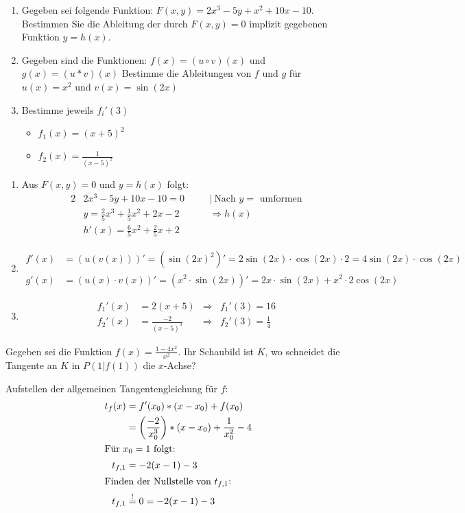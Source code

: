 \begin{enumerate}
	\item Gegeben sei folgende Funktion: $F(x,y)=2x^3-5y+x^2+10x-10$. Bestimmen Sie die Ableitung der durch $F(x,y)=0$ implizit gegebenen Funktion $y=h(x)$.
	\item Gegeben sind die Funktionen:
	$f(x) = (u \circ v)(x)$ und $g(x) = (u* v)(x)$
	Bestimme die Ableitungen von $f$ und $g$ für $u(x)=x^2$ und $v(x)=\sin(2x)$
	\item Bestimme jeweils $f_i'(3)$
	\begin{itemize}
		\item $f_1(x) = (x+5)^2$
		\item $f_2(x) = \frac{1}{(x-5)^2}$
	\end{itemize}
\end{enumerate}
\begin{lsg}{}
	\begin{enumerate}
		\item Aus $F(x,y)=0$ und $y=h(x)$ folgt:\begin{alignat*}{2}
		&2x^3-5y+10x-10=0\quad&&|\ \text{Nach $y=$ umformen}\\
		&y=\frac{2}{5} x^3+\frac{1}{5} x^2+2x-2 &&\Rightarrow h(x)\\
		&h'(x)=\frac{6}{5} x^2+\frac{2}{5}x+2
		\end{alignat*}
		\item \begin{align*}
		f'(x)&=\left(u(v(x))\right)'=\left({\sin(2x)}^2\right)'=2\sin(2x)\cdot \cos(2x) \cdot 2=4\sin(2x)\cdot \cos(2x)\\
		g'(x)&=(u(x)\cdot v(x))'=\left(x^2\cdot \sin(2x)\right)'=2x\cdot \sin(2x)+x^2\cdot 2\cos(2x)
		\end{align*}
		\item \begin{align*}
		f_1'(x)&=2(x+5)&\Rightarrow  &f_1'(3)=16\\
		f_2'(x)&=\frac{-2}{(x-5)^3}&\Rightarrow &f_2'(3)=\frac{1}{4}
		\end{align*}
	\end{enumerate}
\end{lsg}




Gegeben sei die Funktion $f(x) = \frac{1-4x^2}{x^2}$. Ihr Schaubild ist $K$, wo schneidet die Tangente an $K$ in $P(1|f(1))$ die $x$-Achse?
\begin{lsg}{}
	Aufstellen der allgemeinen Tangentengleichung für $f$:
	\begin{align*}
		t_f(x)&=f'(x_0)*(x-x_0)+f(x_0)\\
					&=\left(\frac{-2}{x_0^3}\right)*(x-x_0)+\frac{1}{x_0^2}-4\\
		\intertext{Für $x_0=1$ folgt:}
		t_{f,1}&=-2(x-1)-3\\
		\intertext{Finden der Nullstelle von $t_{f,1}$:}
		t_{f,1}&\overset!=0=-2(x-1)-3\\
	\end{align*}
\end{lsg}



	




